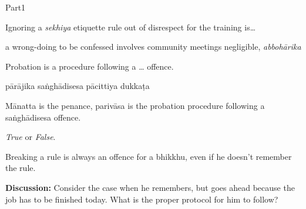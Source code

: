 \documentclass[11pt,oneside]{memoir}
\begin{document}
\begin{exam}{Part1}
\begin{problem*}
\end{problem*}

\problemDivide

\begin{problem*}

  \begin{parts}

  \item Ignoring a \emph{sekhiya} etiquette rule out of disrespect for the
    training is\ldots

    \begin{answers}{4}
      \bChoices
       a wrong-doing\eAns
       to be confessed\eAns
       involves community meetings\eAns
       negligible, \emph{abbohārika}\eAns
      \eChoices
    \end{answers}

  \item Probation is a procedure following a \ldots{} offence.

    \begin{answers}{4}
      \bChoices
       pārājika\eAns
       saṅghādisesa\eAns
       pācittiya\eAns
       dukkaṭa\eAns
      \eChoices
    \end{answers}

  \end{parts}
  
  \bigskip

  \begin{solution}
    Mānatta is the penance, parivāsa is the probation procedure following a saṅghādisesa offence.
  \end{solution}

\end{problem*}


\begin{problem*}

  \textit{True} or \textit{False}.

  \bigskip

  \begin{parts}

  \item {} Breaking a rule is always an offence for a bhikkhu, even if he doesn't
    remember the rule.

    \bigskip

    \textbf{Discussion:} Consider the case when he remembers, but goes ahead because the job has to be finished today.
    What is the proper protocol for him to follow?


\end{parts}
\end{problem*}
\end{exam}
\end{document}
